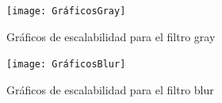 \documentclass[12pt,a4paper]{article}
\begin{document}
\begin{figure}
  \centering
    \texttt{[image: GráficosGray]}
  \caption{Gráficos de escalabilidad para el filtro gray}
  \label{fig:ejemplo}
\end{figure}


\begin{figure}
  \centering
    \texttt{[image: GráficosBlur]}
  \caption{Gráficos de escalabilidad para el filtro blur}
  \label{fig:ejemplo}
\end{figure}
\end{document}
